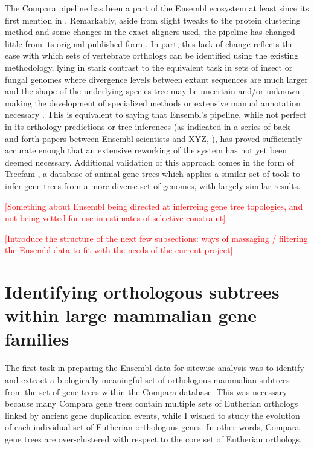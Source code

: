 The Compara pipeline has been a part of the Ensembl ecosystem at least
since its first mention in \citep{TODO}. Remarkably, aside from slight
tweaks to the protein clustering method and some changes in the exact
aligners used, the pipeline has changed little from its original
published form \citep{TODO}. In part, this lack of change reflects the
ease with which sets of vertebrate orthologs can be identified using
the existing methodology, lying in stark contrast to the equivalent
task in sets of insect or fungal genomes where divergence levels
between extant sequences are much larger \citep{TODO} and the shape of
the underlying species tree may be uncertain and/or unknown
\citep{TODO}, making the development of specialized methods or
extensive manual annotation necessary \citep{TODO}. This is equivalent
to saying that Ensembl's pipeline, while not perfect in its orthology
predictions or tree inferences (as indicated in a series of
back-and-forth papers between Ensembl scientists and XYZ,
\citep{TODO}), has proved sufficiently accurate enough that an
extensive reworking of the system has not yet been deemed
necessary. Additional validation of this approach comes in the form of
Treefam \citep{TODO}, a database of animal gene trees which applies a
similar set of tools to infer gene trees from a more diverse set of
genomes, with largely similar results.

\textcolor{red}{[Something about Ensembl being directed at inferreing
    gene tree topologies, and not being vetted for use in estimates of
    selective constraint]}

\textcolor{red}{[Introduce the structure of the next few subsections:
    ways of massaging / filtering the Ensembl data to fit with the
    needs of the current project]}

\section{Identifying orthologous subtrees within large mammalian gene families}

The first task in preparing the Ensembl data for sitewise analysis was
to identify and extract a biologically meaningful set of orthologous
mammalian subtrees from the set of gene trees within the Compara
database. This was necessary because many Compara gene trees contain
multiple sets of Eutherian orthologs linked by ancient gene
duplication events, while I wished to study the evolution of each
individual set of Eutherian orthologous genes. In other words, Compara
gene trees are over-clustered with respect to the core set of
Eutherian orthologs.

